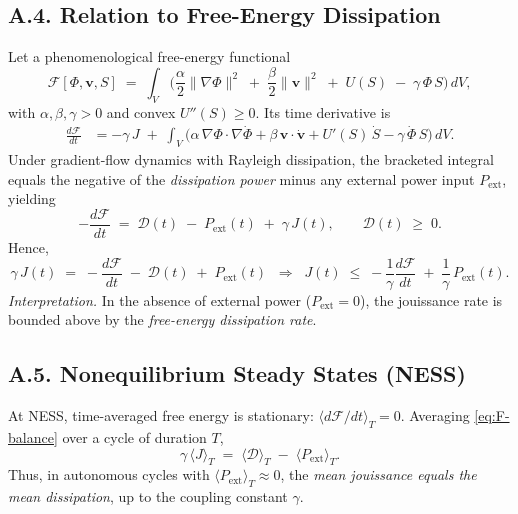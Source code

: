 \documentclass[12pt,a4paper]{article}
\begin{document}
\subsection*{A.4. Relation to Free-Energy Dissipation}
Let a phenomenological free-energy functional
\begin{equation}
\label{eq:F-functional}
\mathcal{F}[\Phi,\mathbf{v},S] \;=\; \int_V \Big(
\frac{\alpha}{2}\|\nabla\Phi\|^2 \;+\; \frac{\beta}{2}\|\mathbf{v}\|^2 \;+\; U(S) \;-\; \gamma\,\Phi\,S
\Big)\,dV,
\end{equation}
with $\alpha,\beta,\gamma>0$ and convex $U''(S)\!\ge\!0$. Its time derivative is
\begin{align}
\frac{d\mathcal{F}}{dt}
&= -\gamma\,J \;+\; \int_V \Big(
\alpha\,\nabla\Phi\!\cdot\!\nabla\dot{\Phi}
+ \beta\,\mathbf{v}\!\cdot\!\dot{\mathbf{v}}
+ U'(S)\,\dot{S}
- \gamma\,\dot{\Phi}\,S
\Big)\,dV.
\label{eq:Ftime}
\end{align}
Under gradient-flow dynamics with Rayleigh dissipation, the bracketed integral equals the negative of the \emph{dissipation power} minus any external power input $P_{\text{ext}}$, yielding
\begin{equation}
\label{eq:F-balance}
-\frac{d\mathcal{F}}{dt} \;=\; \mathcal{D}(t) \;-\; P_{\text{ext}}(t) \;+\; \gamma\,J(t),
\qquad \mathcal{D}(t)\;\ge\;0.
\end{equation}
Hence,
\begin{equation}
\label{eq:J-lower}
\gamma\,J(t) \;=\; -\frac{d\mathcal{F}}{dt} \;-\; \mathcal{D}(t) \;+\; P_{\text{ext}}(t)
\;\;\Rightarrow\;\;
J(t) \;\le\; -\frac{1}{\gamma}\frac{d\mathcal{F}}{dt} \;+\; \frac{1}{\gamma}\,P_{\text{ext}}(t).
\end{equation}
\emph{Interpretation.} In the absence of external power ($P_{\text{ext}}{=}0$), the jouissance rate is bounded above by the \emph{free-energy dissipation rate}.

\subsection*{A.5. Nonequilibrium Steady States (NESS)}
At NESS, time-averaged free energy is stationary: $\langle d\mathcal{F}/dt\rangle_T\!=\!0$. Averaging \eqref{eq:F-balance} over a cycle of duration \(T\),
\begin{equation}
\label{eq:NESS-balance}
\gamma\,\langle J\rangle_T \;=\; \langle \mathcal{D}\rangle_T \;-\; \langle P_{\text{ext}}\rangle_T.
\end{equation}
Thus, in autonomous cycles with $\langle P_{\text{ext}}\rangle_T\!\approx\!0$, the \emph{mean jouissance equals the mean dissipation}, up to the coupling constant $\gamma$.
\end{document}
